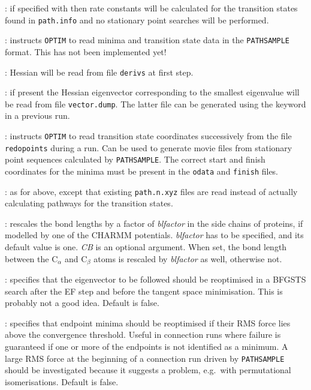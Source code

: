 {{{: if specified with {} then rate constants will be
calculated for the transition states found in {\tt path.info} and no stationary point
searches will be performed.

: instructs {\tt OPTIM} to read minima and 
transition state data in the {\tt PATHSAMPLE} format.
This has not been implemented yet!

: Hessian will be read from file {\tt derivs} at first step.

: if present the Hessian eigenvector
corresponding to the smallest eigenvalue 
will be read from file {\tt vector.dump}. The latter file can be generated using the
{} keyword in a previous run.

: instructs {\tt OPTIM} to read transition state coordinates
successively from the file {\tt redopoints} during a  run.
Can be used to generate movie files from stationary point sequences calculated
by {\tt PATHSAMPLE}. The correct start and finish coordinates for the minima
must be present in the {\tt odata} and {\tt finish} files.

: as for {} above, except that existing
{\tt path.n.xyz\/} files are read instead of actually calculating pathways for the
transition states.

: rescales the bond lengths by a factor
of {\it blfactor} in the side chains of proteins, if modelled by one of the CHARMM
potentials. {\it blfactor} has to be specified, and its default value is one.
{\it CB} is an optional argument. When set, the bond length between the C$_{\alpha}$
and C$_{\beta}$ atoms is rescaled by {\it blfactor} as well, otherwise not.

: specifies that the eigenvector to be followed should be reoptimised
      in a BFGSTS search after the EF step and before the tangent space minimisation.
This is probably not a good idea. Default is false.

: specifies that endpoint minima should be reoptimised
if their RMS force lies above the convergence threshold. Useful in connection 
runs where failure is guaranteed if one or more of the endpoints is not identified
as a minimum. A large RMS force at the beginning of a connection run driven
by {\tt PATHSAMPLE} should be investigated because it suggests a problem, e.g.~with
 permutational isomerisations.
Default is false.

}}}
